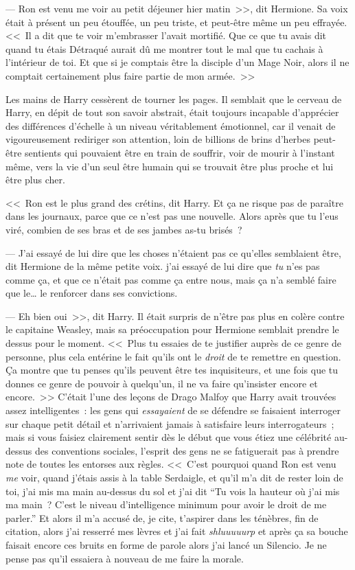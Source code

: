--- Ron est venu me voir au petit déjeuner hier matin~>>, dit Hermione. Sa voix était à présent un peu étouffée, un peu triste, et peut-être même un peu effrayée. <<~Il a dit que te voir m'embrasser l'avait mortifié. Que ce que tu avais dit quand tu étais Détraqué aurait dû me montrer tout le mal que tu cachais à l'intérieur de toi. Et que si je comptais être la disciple d'un Mage Noir, alors il ne comptait certainement plus faire partie de mon armée.~>>

Les mains de Harry cessèrent de tourner les pages. Il semblait que le cerveau de Harry, en dépit de tout son savoir abstrait, était toujours incapable d'apprécier des différences d'échelle à un niveau véritablement émotionnel, car il venait de vigoureusement rediriger son attention, loin de billions de brins d'herbes peut-être sentients qui pouvaient être en train de souffrir, voir de mourir à l'instant même, vers la vie d'un seul être humain qui se trouvait être plus proche et lui être plus cher.

<<~Ron est le plus grand des crétins, dit Harry. Et ça ne risque pas de paraître dans les journaux, parce que ce n'est pas une nouvelle. Alors après que tu l'eus viré, combien de ses bras et de ses jambes as-tu brisés~?

--- J'ai essayé de lui dire que les choses n'étaient pas ce qu'elles semblaient être, dit Hermione de la même petite voix. j'ai essayé de lui dire que \emph{tu} n'es pas comme ça, et que ce n'était pas comme ça entre nous, mais ça n'a semblé faire que le… le renforcer dans ses convictions.

--- Eh bien oui~>>, dit Harry. Il était surpris de n'être pas plus en colère contre le capitaine Weasley, mais sa préoccupation pour Hermione semblait prendre le dessus pour le moment. <<~Plus tu essaies de te justifier auprès de ce genre de personne, plus cela entérine le fait qu'ils ont le \emph{droit} de te remettre en question. Ça montre que tu penses qu'ils peuvent être tes inquisiteurs, et une fois que tu donnes ce genre de pouvoir à quelqu'un, il ne va faire qu'insister encore et encore.~>> C'était l'une des leçons de Drago Malfoy que Harry avait trouvées assez intelligentes~: les gens qui \emph{essayaient} de se défendre se faisaient interroger sur chaque petit détail et n'arrivaient jamais à satisfaire leurs interrogateurs~; mais si vous faisiez clairement sentir dès le début que vous étiez une célébrité au-dessus des conventions sociales, l'esprit des gens ne se fatiguerait pas à prendre note de toutes les entorses aux règles. <<~C'est pourquoi quand Ron est venu \emph{me} voir, quand j'étais assis à la table Serdaigle, et qu'il m'a dit de rester loin de toi, j'ai mis ma main au-dessus du sol et j'ai dit “Tu vois la hauteur où j'ai mis ma main~? C'est le niveau d'intelligence minimum pour avoir le droit de me parler.” Et alors il m'a accusé de, je cite, t'aspirer dans les ténèbres, fin de citation, alors j'ai resserré mes lèvres et j'ai fait \emph{shluuuuurp} et après ça sa bouche faisait encore ces bruits en forme de parole alors j'ai lancé un Silencio. Je ne pense pas qu'il essaiera à nouveau de me faire la morale.

